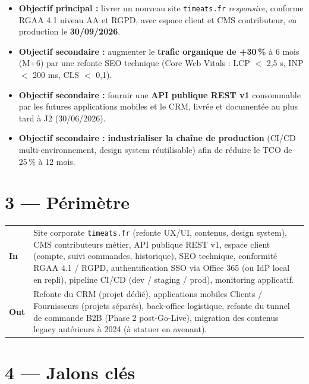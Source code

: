 \documentclass[11pt,a4paper,oneside]{report}
\begin{document}
\begin{itemize}
  \item \textbf{Objectif principal :} livrer un nouveau site \texttt{timeats.fr} \emph{responsive}, conforme RGAA 4.1 niveau AA et RGPD, avec espace client et CMS contributeur, en production le \textbf{30/09/2026}.
  \item \textbf{Objectif secondaire :} augmenter le \textbf{trafic organique de +30\,\%} à 6 mois (M+6) par une refonte SEO technique (Core Web Vitals : LCP $<$ 2{,}5 s, INP $<$ 200 ms, CLS $<$ 0{,}1).
  \item \textbf{Objectif secondaire :} fournir une \textbf{API publique REST v1} consommable par les futures applications mobiles et le CRM, livrée et documentée au plus tard à J2 (30/06/2026).
  \item \textbf{Objectif secondaire :} \textbf{industrialiser la chaîne de production} (CI/CD multi-environnement, design system réutilisable) afin de réduire le TCO de 25\,\% à 12 mois.
\end{itemize}

\section*{3 --- Périmètre}

\renewcommand{\arraystretch}{1.3}
\begin{tabularx}{\textwidth}{L{1.5cm} Y}
\toprule
{}\th{} &  \\
\midrule
{}\textbf{In} & Site corporate \texttt{timeats.fr} (refonte UX/UI, contenus, design system), CMS contributeurs métier, API publique REST v1, espace client (compte, suivi commandes, historique), SEO technique, conformité RGAA 4.1 / RGPD, authentification SSO via Office 365 (ou IdP local en repli), pipeline CI/CD (dev / staging / prod), monitoring applicatif. \\
\textbf{Out} & Refonte du CRM (projet dédié), applications mobiles Clients / Fournisseurs (projets séparés), back-office logistique, refonte du tunnel de commande B2B (Phase 2 post-Go-Live), migration des contenus legacy antérieurs à 2024 (à statuer en avenant). \\
\bottomrule
\end{tabularx}

\section*{4 --- Jalons clés}
\end{document}
